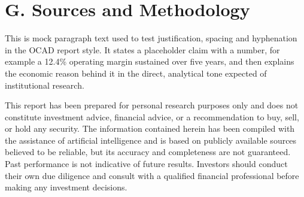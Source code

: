 \documentclass[10pt,a4paper]{article}
\newcommand{\mocktext}{This is mock paragraph text used to test justification, spacing and hyphenation in the OCAD report style. It states a placeholder claim with a number, for example a 12.4\% operating margin sustained over five years, and then explains the economic reason behind it in the direct, analytical tone expected of institutional research.}
\begin{document}
\section{G. Sources and Methodology}
\mocktext
\begin{ocaddisclaimer}
This report has been prepared for personal research purposes only and does not constitute investment advice, financial advice, or a recommendation to buy, sell, or hold any security. The information contained herein has been compiled with the assistance of artificial intelligence and is based on publicly available sources believed to be reliable, but its accuracy and completeness are not guaranteed. Past performance is not indicative of future results. Investors should conduct their own due diligence and consult with a qualified financial professional before making any investment decisions.
\end{ocaddisclaimer}
\end{document}
